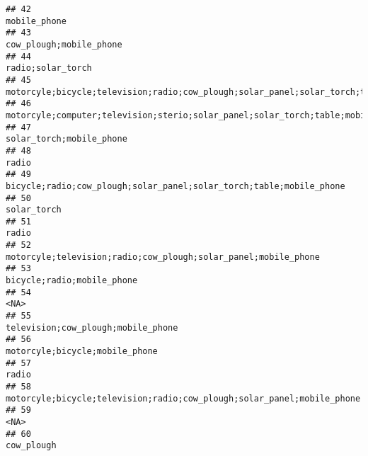 \documentclass[
]{article}
\begin{document}
\begin{verbatim}
## 42                                                                                                                              mobile_phone
## 43                                                                                                                   cow_plough;mobile_phone
## 44                                                                                                                         radio;solar_torch
## 45                                                  motorcyle;bicycle;television;radio;cow_plough;solar_panel;solar_torch;table;mobile_phone
## 46                                                           motorcyle;computer;television;sterio;solar_panel;solar_torch;table;mobile_phone
## 47                                                                                                                  solar_torch;mobile_phone
## 48                                                                                                                                     radio
## 49                                                                       bicycle;radio;cow_plough;solar_panel;solar_torch;table;mobile_phone
## 50                                                                                                                               solar_torch
## 51                                                                                                                                     radio
## 52                                                                            motorcyle;television;radio;cow_plough;solar_panel;mobile_phone
## 53                                                                                                                bicycle;radio;mobile_phone
## 54                                                                                                                                      <NA>
## 55                                                                                                        television;cow_plough;mobile_phone
## 56                                                                                                            motorcyle;bicycle;mobile_phone
## 57                                                                                                                                     radio
## 58                                                                    motorcyle;bicycle;television;radio;cow_plough;solar_panel;mobile_phone
## 59                                                                                                                                      <NA>
## 60                                                                                                                                cow_plough

\end{verbatim}
\end{document}
